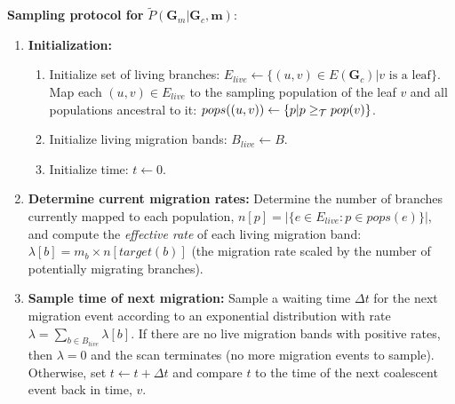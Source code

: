 \documentclass[11pt]{article}
\newcommand{\vect}[1]{\boldsymbol{\mathbf{#1}}}
\newcommand{\G}{\vect{G}}
\newcommand{\Pref}{\widetilde{P}}
\newcommand{\1}{\mathbbm{1}}
\newcommand{\Gc}{\G_c}
\newcommand{\Gm}{\G_m}
\newcommand{\migs}{\vect{m}}
\begin{document}
\noindent \textbf{Sampling protocol for } $\Pref(\Gm|\Gc,\migs)$:
%
%
\begin{enumerate}\vspace{-1em}
  \item \textbf{Initialization:}
  \begin{enumerate}
    \item \label{step:init_mapping} Initialize set of living branches: $E_{live}\leftarrow\{(u,v)\in E(\Gc)| v \text{ is a leaf}\}$. Map each $(u,v)\in E_{live}$ to the sampling population of the leaf $v$
    and all populations ancestral to it: $pops((u,v))\leftarrow\{p|p\geq_{\mathcal{T}} pop(v)\}$.
    \item Initialize living migration bands: $B_{live}\leftarrow B$.
    \item Initialize time: $t\leftarrow 0$.
 \end{enumerate}
 
  \item \label{step:interval} \textbf{Determine current migration rates:}
    Determine the number of branches currently mapped to each population, $n[p]=|\{e\in E_{live}:p\in pops(e)\}|$, and 
    compute the \emph{effective rate} of each living migration band:  $\lambda[b] = m_b\times n[target(b)]$
    (the migration rate scaled by the number of potentially migrating branches).
  \item  \label{step:deltaT} \textbf{Sample time of next migration:} 
    Sample a waiting time $\Delta t$ for the next migration event according to an exponential distribution with rate $\lambda=\sum_{b\in B_{live}}\lambda[b]$. 
    If there are no live migration bands with positive rates, then $\lambda=0$ and the scan terminates (no more migration events to sample).
    Otherwise, set $t\leftarrow t+\Delta t$ and compare $t$ to the time of the next coalescent event back in time, $v$.


\end{enumerate}
\end{document}
